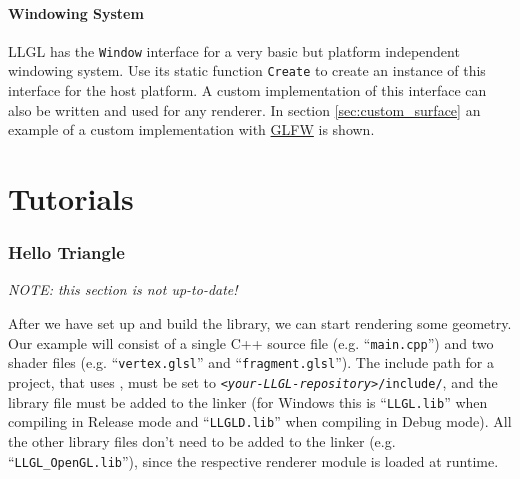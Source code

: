 \documentclass{article}
\begin{document}
\subsection{Windowing System}

LLGL has the \texttt{Window} interface for a very basic but platform independent windowing system.
Use its static function \texttt{Create} to create an instance of this interface for the host platform.
A custom implementation of this interface can also be written and used for any renderer.
In section \ref{sec:custom_surface} an example of a custom implementation with \href{http://www.glfw.org/}{GLFW} is shown.



\newpage
\part{Tutorials}

\section{Hello Triangle}

\textit{NOTE: this section is not up-to-date!} \\
\noindent

After we have set up and build the library, we can start rendering some geometry.
Our example will consist of a single C++ source file (e.g. ``\texttt{main.cpp}'') and two shader files
(e.g. ``\texttt{vertex.glsl}'' and ``\texttt{fragment.glsl}'').
The include path for a project, that uses \LLGL, must be set to \texttt{\textit{<your-LLGL-repository>}/include/},
and the \LLGL library file must be added to the linker (for Windows this is ``\texttt{LLGL.lib}''
when compiling in Release mode and ``\texttt{LLGLD.lib}'' when compiling in Debug mode).
All the other library files don't need to be added to the linker (e.g. ``\texttt{LLGL\_OpenGL.lib}''),
since the respective renderer module is loaded at runtime.
\end{document}
